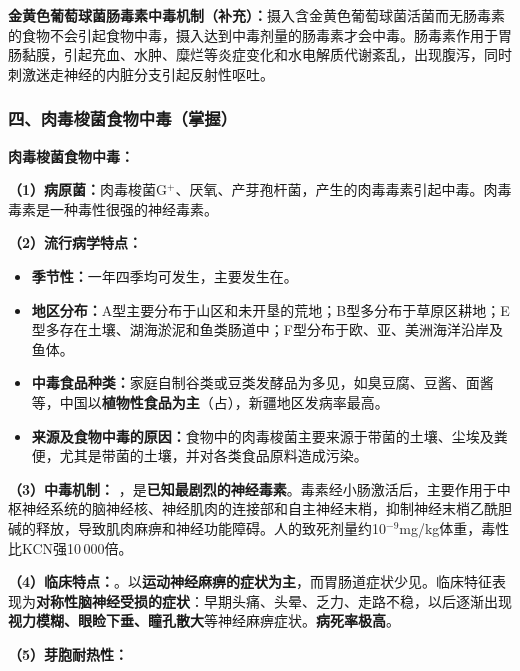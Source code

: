 \begin{tipbox}
\textbf{金黄色葡萄球菌肠毒素中毒机制（补充）：}摄入含金黄色葡萄球菌活菌而无肠毒素的食物不会引起食物中毒，摄入达到中毒剂量的肠毒素才会中毒。肠毒素作用于胃肠黏膜，引起充血、水肿、糜烂等炎症变化和水电解质代谢紊乱，出现腹泻，同时刺激迷走神经的内脏分支引起反射性呕吐。
\end{tipbox}

\subsubsection{四、肉毒梭菌食物中毒（掌握）}\difficulty

\begin{keybox}
\textbf{肉毒梭菌食物中毒：}

\textbf{（1）病原菌：}肉毒梭菌G$^+$、厌氧、产芽孢杆菌，产生的肉毒毒素引起中毒。肉毒毒素是一种毒性很强的神经毒素。

\textbf{（2）流行病学特点：}
\begin{itemize}[leftmargin=*]
    \item \textbf{季节性：}一年四季均可发生，主要发生在。
    \item \textbf{地区分布：}A型主要分布于山区和未开垦的荒地；B型多分布于草原区耕地；E型多存在土壤、湖海淤泥和鱼类肠道中；F型分布于欧、亚、美洲海洋沿岸及鱼体。
    \item \textbf{中毒食品种类：}家庭自制谷类或豆类发酵品为多见，如臭豆腐、豆酱、面酱等，中国以\textbf{植物性食品为主}（占），新疆地区发病率最高。
    \item \textbf{来源及食物中毒的原因：}食物中的肉毒梭菌主要来源于带菌的土壤、尘埃及粪便，尤其是带菌的土壤，并对各类食品原料造成污染。
\end{itemize}

\textbf{（3）中毒机制：}\difficulty
{}，是\textbf{已知最剧烈的神经毒素}。毒素经小肠激活后，主要作用于中枢神经系统的脑神经核、神经肌肉的连接部和自主神经末梢，抑制神经末梢乙酰胆碱的释放，导致肌肉麻痹和神经功能障碍。人的致死剂量约10$^{-9}$mg/kg体重，毒性比KCN强10\,000倍。

\textbf{（4）临床特点：}。以\textbf{运动神经麻痹的症状为主}，而胃肠道症状少见。临床特征表现为\textbf{对称性脑神经受损的症状}：早期头痛、头晕、乏力、走路不稳，以后逐渐出现\textbf{视力模糊、眼睑下垂、瞳孔散大}等神经麻痹症状。\textbf{病死率极高}。

\textbf{（5）芽胞耐热性：}


\end{keybox}
